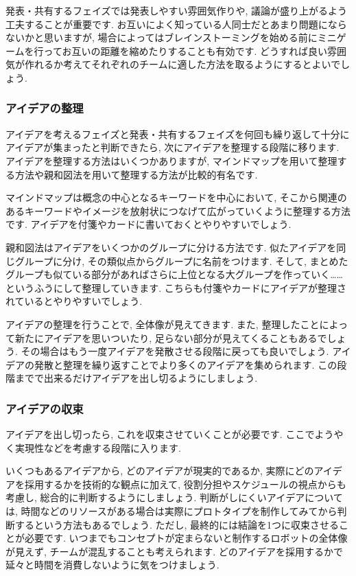 発表・共有するフェイズでは発表しやすい雰囲気作りや, 議論が盛り上がるよう工夫することが重要です. 
お互いによく知っている人同士だとあまり問題にならないかと思いますが, 
場合によってはブレインストーミングを始める前にミニゲームを行ってお互いの距離を縮めたりすることも有効です. どうすれば良い雰囲気が作れるか考えてそれぞれのチームに適した方法を取るようにするとよいでしょう.  

\subsubsection{アイデアの整理}
アイデアを考えるフェイズと発表・共有するフェイズを何回も繰り返して十分にアイデアが集まったと判断できたら, 次にアイデアを整理する段階に移ります. アイデアを整理する方法はいくつかありますが, マインドマップを用いて整理する方法や親和図法を用いて整理する方法が比較的有名です. 

マインドマップは概念の中心となるキーワードを中心において, そこから関連のあるキーワードやイメージを放射状につなげて広がっていくように整理する方法です. アイデアを付箋やカードに書いておくとやりやすいでしょう. 

親和図法はアイデアをいくつかのグループに分ける方法です. 似たアイデアを同じグループに分け, その類似点からグループに名前をつけます. そして, まとめたグループも似ている部分があればさらに上位となる大グループを作っていく……というふうにして整理していきます. こちらも付箋やカードにアイデアが整理されているとやりやすいでしょう. 

アイデアの整理を行うことで, 全体像が見えてきます. また, 整理したことによって新たにアイデアを思いついたり, 足らない部分が見えてくることもあるでしょう. その場合はもう一度アイデアを発散させる段階に戻っても良いでしょう. アイデアの発散と整理を繰り返すことでより多くのアイデアを集められます. この段階までで出来るだけアイデアを出し切るようにしましょう. 

\subsubsection{アイデアの収束}
アイデアを出し切ったら, これを収束させていくことが必要です. ここでようやく実現性などを考慮する段階に入ります. 

いくつもあるアイデアから, どのアイデアが現実的であるか, 実際にどのアイデアを採用するかを技術的な観点に加えて, 役割分担やスケジュールの視点からも考慮し, 総合的に判断するようにしましょう. 判断がしにくいアイデアについては, 時間などのリソースがある場合は実際にプロトタイプを制作してみてから判断するという方法もあるでしょう. ただし, 最終的には結論を1つに収束させることが必要です. いつまでもコンセプトが定まらないと制作するロボットの全体像が見えず, チームが混乱することも考えられます. どのアイデアを採用するかで延々と時間を消費しないように気をつけましょう. 